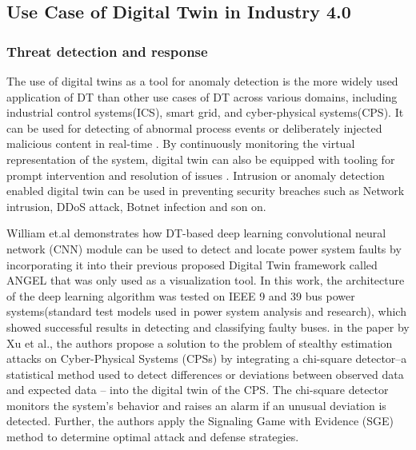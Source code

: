 
%
\subsection{Use Case of Digital Twin in Industry 4.0}

\subsubsection{Threat detection and response}
The use of digital twins as a tool for anomaly detection is the more widely used application of DT than other use cases of DT across various domains, including industrial control systems(ICS), smart grid, and cyber-physical systems(CPS). It can be used for detecting of abnormal process events \cite{xuGametheoreticApproachSecure2020} or deliberately injected malicious content \cite{saadImplementationIoTBasedDigital2020} in real-time \cite{vargheseDigitalTwinbasedIntrusion2022}. By continuously monitoring the virtual representation of the system, digital twin can also be equipped with tooling for prompt intervention and resolution of issues \cite{akbarianSecurityFrameworkDigital2021}. Intrusion or anomaly detection enabled digital twin can be used in preventing security breaches such as Network intrusion, DDoS attack, Botnet infection and son on. 

William et.al \cite{danilczykSmartGridAnomaly2021} demonstrates how DT-based deep learning convolutional neural network (CNN) module can be used to detect and locate power system faults by incorporating it into their previous proposed Digital Twin framework called ANGEL\cite{williamdanilczykANGELIntelligentDigital2019} that was only used as a visualization tool. In this work, the architecture of the deep learning algorithm was tested on IEEE 9 and 39 bus power systems(standard test models used in power system analysis and research), which showed successful results in detecting and classifying faulty buses. in the paper by Xu et al.\cite{xuGametheoreticApproachSecure2020}, the authors propose a solution to the problem of stealthy estimation attacks on Cyber-Physical Systems (CPSs) by integrating a chi-square detector--a statistical method used to detect differences or deviations between observed data and expected data -- into the digital twin of the CPS. The chi-square detector monitors the system's behavior and raises an alarm if an unusual deviation is detected. Further, the authors apply the Signaling Game with Evidence (SGE) method to determine optimal attack and defense strategies. 

